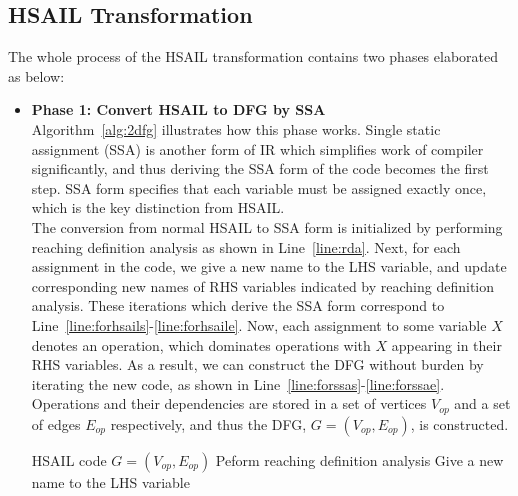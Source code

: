         \subsection{HSAIL Transformation}
        \label{sec:trans}
        The whole process of the HSAIL transformation contains two phases elaborated as below:
        \begin{itemize}
            \item \textbf{Phase 1: Convert HSAIL to DFG by SSA} \\\indent
                Algorithm~\ref{alg:2dfg} illustrates how this phase works.
                Single static assignment (SSA) \cite{ssa} is another form of IR which simplifies work of compiler significantly, 
                and thus deriving the SSA form of the code becomes the first step.
                SSA form specifies that each variable must be assigned exactly once, which is the key distinction from HSAIL.
                \\\indent
                The conversion from normal HSAIL to SSA form is initialized by performing reaching definition analysis \cite{rda} as shown in Line~\ref{line:rda}.
                Next, for each assignment in the code, we give a new name to the LHS variable, and update corresponding new names of RHS variables indicated by reaching definition analysis.
                These iterations which derive the SSA form correspond to Line~\ref{line:forhsails}-\ref{line:forhsaile}.
                Now, each assignment to some variable $X$ denotes an operation, which dominates operations with $X$ appearing in their RHS variables.
                As a result, we can construct the DFG without burden by iterating the new code, as shown in Line~\ref{line:forssas}-\ref{line:forssae}.
                Operations and their dependencies are stored in a set of vertices $V_{op}$ and a set of edges $E_{op}$ respectively, 
                and thus the DFG, $G = ( V_{op} , E_{op} )$, is constructed.
        \begin{algorithm}[ht!]    \caption{}
        \begin{algorithmic}[1]
            \Require    HSAIL code
            \Ensure     $G = ( V_{op} , E_{op} )$   
            \State      Peform reaching definition analysis     \label{line:rda}
                 \label{line:forhsails}
                \State      Give a new name to the LHS variable

\end{algorithmic}
\end{algorithm}
\end{itemize}
